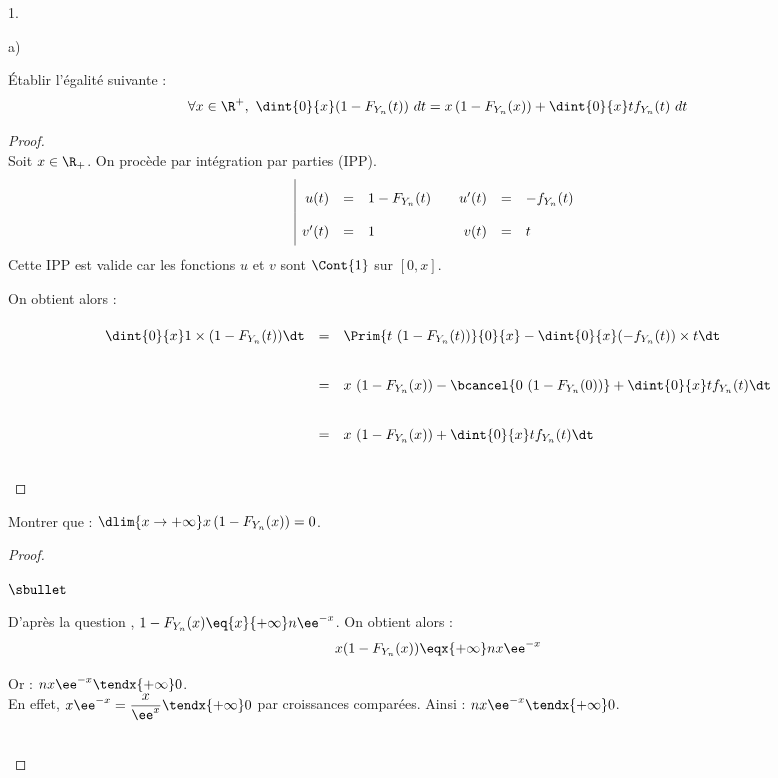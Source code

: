 \documentclass[11pt]{article}%
\begin{document}
\begin{noliste}{1.}
\begin{noliste}{a)}
  \item Établir l'égalité suivante :
    \[
    \forall x \in \R^+, \ \dint{0}{x} (1-F_{Y_{n}}(t)) \ dt =
    x\left(1-F_{Y_{n}}(x)\right) + \dint{0}{x} t f_{Y_{n}}(t) \ dt
    \]
    
    \begin{proof}~\\
      Soit $x\in\R_+$.
      On procède par intégration par parties (IPP).
        \[
        \renewcommand{\arraystretch}{2}
        \begin{array}{|rcl@{\qquad}rcl}
          u(t) & = & 1-F_{Y_n}(t) & u'(t) & = & -f_{Y_n}(t) \\
          v'(t) & = & 1 & v(t) & = & t
        \end{array}
        \]
      Cette IPP est valide car les fonctions $u$ et $v$ sont 
      $\Cont{1}$ sur $[0, x]$. 


      \newpage

      
      \noindent
      On obtient alors :
      \[
       \begin{array}{rcl}
        \dint{0}{x} 1 \times (1-F_{Y_n}(t))\dt & = & \Prim{ 
	t \ (1-F_{Y_n}(t))}{0}{x} - \dint{0}{x} (-f_{Y_n}(t)) \times 
	t\dt
        \\[.4cm]
        & = & x \ (1-F_{Y_n}(x)) - \bcancel{0 \ (1-F_{Y_n}(0))}
         + \dint{0}{x} tf_{Y_n}(t) \dt
        \\[.4cm]
        & = & x \ (1-F_{Y_n}(x)) + \dint{0}{x} tf_{Y_n}(t) \dt
       \end{array}
      \]
      ~\\[-1cm]
    \end{proof}
    
  \item Montrer que : $\dlim{ x \to + \infty} x\left(1-F_{Y_{n}}(x)
    \right) = 0$.
    
    \begin{proof}~%
      \begin{noliste}{$\sbullet$}
      \item D'après la question , $1-F_{Y_n}(x)
        \eq{x}{+\infty} n\ee^{-x}$. On obtient alors :
        \[
        x(1-F_{Y_n}(x)) \eqx{+\infty} nx\ee^{-x}
        \]

      \item Or : $nx\ee^{-x} \tendx{+\infty} 0$.\\
        En effet, $x\ee^{-x} = \dfrac{x}{\ee^x} \tendx{+\infty} 0$ par
        croissances comparées. Ainsi : $nx\ee^{-x} \tendx{+\infty} 0$.
      \end{noliste}
      ~\\[-1.2cm]
    \end{proof}
    

\end{noliste}
\end{noliste}
\end{document}
